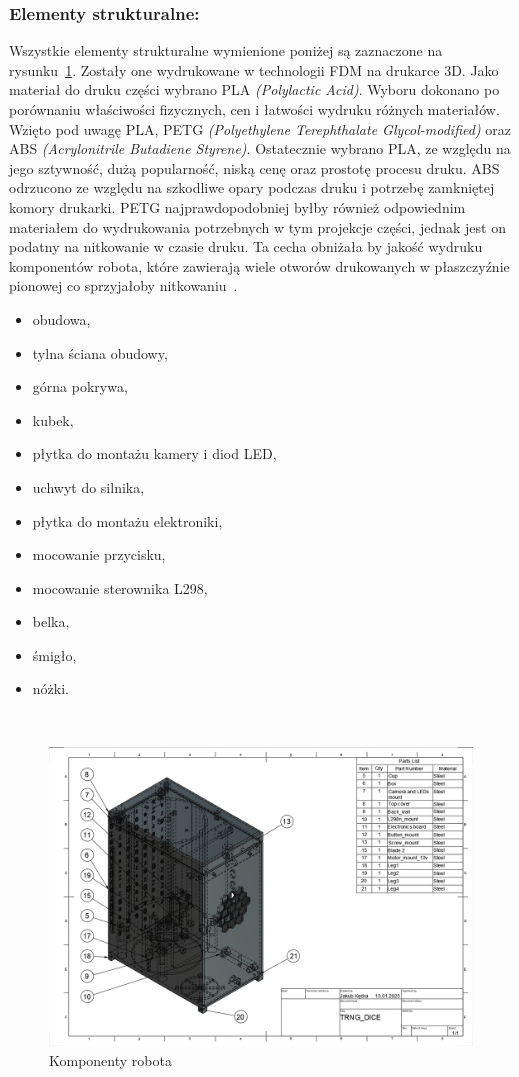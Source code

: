 \subsubsection{Elementy strukturalne:}
Wszystkie elementy strukturalne wymienione poniżej są zaznaczone na rysunku~\ref{fig:komponenty}. Zostały one wydrukowane w technologii FDM na drukarce 3D. Jako materiał do druku części wybrano
PLA \textit{(Polylactic Acid)}. Wyboru dokonano po porównaniu właściwości fizycznych, cen i łatwości wydruku różnych materiałów. Wzięto pod uwagę
PLA, PETG \textit{(Polyethylene Terephthalate Glycol-modified)} oraz ABS \textit{(Acrylonitrile Butadiene Styrene)}. Ostatecznie wybrano PLA, ze względu na jego sztywność, dużą popularność,
niską cenę oraz prostotę procesu druku. ABS odrzucono ze względu na szkodliwe opary podczas druku i potrzebę zamkniętej komory drukarki. PETG najprawdopodobniej
byłby również odpowiednim materiałem do wydrukowania potrzebnych w tym projekcje części, jednak jest on podatny na nitkowanie w czasie druku. Ta cecha
obniżała by jakość wydruku komponentów robota, które zawierają wiele otworów drukowanych w płaszczyźnie pionowej co sprzyjałoby nitkowaniu~\cite{PLA,PETG,ABS,PLA2}.
    \begin{itemize}
        \item obudowa,
        \item tylna ściana obudowy,
        \item górna pokrywa,
        \item kubek,
        \item płytka do montażu kamery i diod LED,
        \item uchwyt do silnika,
        \item płytka do montażu elektroniki,
        \item mocowanie przycisku,
        \item mocowanie sterownika L298,
        \item belka,
        \item śmigło,
        \item nóżki.
    \end{itemize}\
    \begin{figure}[H]
        \centering
        \includegraphics[width=0.95\linewidth]{chapters/03-praca-wlasna/figures/komponenty}
        \caption{\label{fig:komponenty}Komponenty robota}
    \end{figure}

